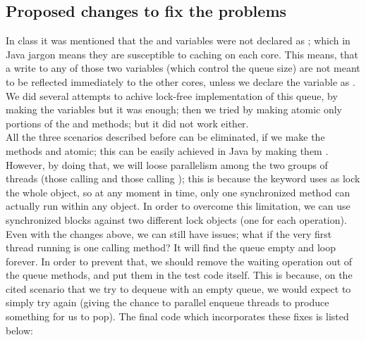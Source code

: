\subsection{Proposed changes to fix the problems}

In class it was mentioned that the  and  variables
were not declared as ; which in Java jargon means they are
susceptible to caching on each core. This means, that a write to any
of those two variables (which control the queue size) are not meant to
be reflected immediately to the other cores, unless we declare the
variable as . We did several attempts to achive lock-free
implementation of this queue, by making the variables  but
it was enough; then we tried by making atomic only portions of the
 and  methods; but it did not work either. \\

All the three scenarios described before can be eliminated, if we make
the methods  and  atomic; this can be easily achieved in
Java by making them . However, by doing that, we will
loose parallelism among the two groups of threads (those calling
 and those calling ); this is because the
 keyword uses as lock the whole object, so at any
moment in time, only one synchronized method can actually run within any object. In
order to overcome this limitation, we can use synchronized blocks
against two different lock objects (one for each operation). \\

Even with the changes above, we can still have issues; what if the
very first thread running is one calling  method? It will find
the queue empty and loop forever. In order to prevent that, we should
remove the waiting operation out of the queue methods, and put them in
the test code itself. This is because, on the cited scenario that we
try to dequeue with an empty queue, we would expect to simply try
again (giving the chance to parallel enqueue threads to produce something for
us to pop). The final code which incorporates these fixes is listed
below: \\

